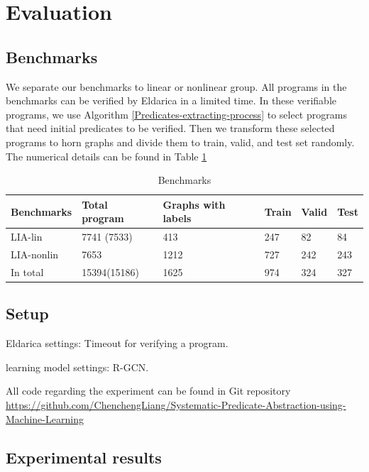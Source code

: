 \documentclass{article}
\begin{document}
\section{Evaluation}
\subsection{Benchmarks}

We separate our benchmarks to linear or nonlinear group. All programs in the benchmarks can be verified by Eldarica in a limited time.
In these verifiable programs, we use Algorithm \ref{Predicates-extracting-process} to select programs that need initial predicates to be verified. Then we transform these selected programs to horn graphs and divide them to train, valid, and test set randomly. The numerical details can be found in Table \ref{benchmark-train-valid-test}

\begin{table}[h]\caption{Benchmarks}\label{benchmark-train-valid-test}
\begin{center}
\begin{tabular}{lp{2cm}p{3cm}p{2cm}p{2cm}p{2cm}}
\hline
Benchmarks  & Total program & Graphs with labels & Train & Valid & Test  \\
\hline
LIA-lin       & 7741 (7533)  & 413 & 247 & 82 & 84 \\
LIA-nonlin    & 7653         & 1212 & 727 & 242 & 243 \\
In total      & 15394(15186) & 1625 & 974 & 324 & 327 \\
\hline
\end{tabular}
\end{center}
\end{table}

\subsection{Setup}

Eldarica settings:
Timeout for verifying a program.

learning model settings:
R-GCN.



All code regarding the experiment can be found in Git repository \href{https://github.com/ChenchengLiang/Systematic-Predicate-Abstraction-using-Machine-Learning}{https://github.com/ChenchengLiang/Systematic-Predicate-Abstraction-using-Machine-Learning}

\subsection{Experimental results}
\end{document}
